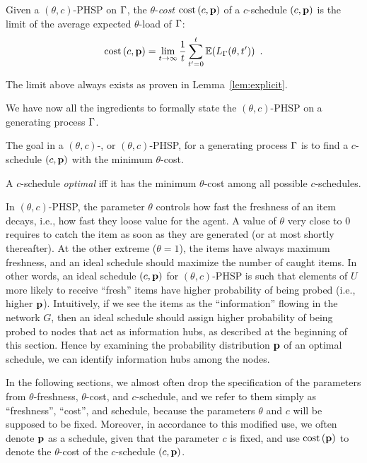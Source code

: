 \begin{definition}
	Given a $(\theta,c)$-PHSP on $\Gamma$, the $\theta$-\emph{cost} $\text{cost}\left( c,\mathbf{p} \right)$
	of a $c$-schedule $(c,\mathbf{p})$ is the limit of the average expected
	$\theta$-load of $\Gamma$:
	\[
		\text{cost}\left( c,\mathbf{p} \right)=\lim\limits_{t\rightarrow\infty}\frac{1}{t}\sum_{t'=0}^{t}\mathbb{E}(L_\Gamma(\theta,t'))\enspace.
	\]
\end{definition}
The limit above always exists as proven in Lemma~\ref{lem:explicit}.

We have now all the ingredients to formally state the $(\theta,c)$-PHSP on a
generating process $\Gamma$.

\begin{definition}[\probname]\label{def:phsp}
	The goal in a $(\theta,c)$-{\probname}, or $(\theta,c)$-PHSP, for a
	generating process $\Gamma$ is to find a $c$-schedule $(c,\mathbf{p})$ with the
	minimum $\theta$-cost.

	A $c$-schedule \emph{optimal} iff it has the minimum $\theta$-cost among all
	possible $c$-schedules.
\end{definition}

In $(\theta,c)$-PHSP, the parameter $\theta$ controls how fast the freshness of
an item decays, i.e., how fast they loose value for the agent. A value of
$\theta$ very close to $0$ requires to catch the item  as soon as they are
generated (or at most shortly thereafter). At the other extreme ($\theta=1$),
the items have always maximum freshness, and an ideal schedule should maximize
the number of caught items.  In other words, an ideal schedule $(c,\mathbf{p})$ for
$(\theta, c)$-PHSP is such that elements of $U$ more likely to receive ``fresh''
items have higher probability of being probed (i.e., higher $\mathbf{p}$). Intuitively,
if we see the items as the ``information'' flowing in the network $G$, then an
ideal schedule should assign higher probability of being probed to nodes that
act as information hubs, as described at the beginning of this section. Hence by
examining the probability distribution $\mathbf{p}$ of an optimal schedule, we can
identify information hubs among the nodes.

In the following sections, we almost often drop the specification of the
parameters from $\theta$-freshness, $\theta$-cost, and $c$-schedule, and we
refer to them simply as ``freshness'', ``cost'', and schedule, because the
parameters $\theta$ and $c$ will be supposed to be fixed. Moreover, in
accordance to this modified use, we often denote $\mathbf{p}$ as a schedule, given that
the parameter $c$ is fixed, and use $\text{cost}\left( \mathbf{p} \right)$ to denote the $\theta$-cost of
the $c$-schedule $(c,\mathbf{p})$.
